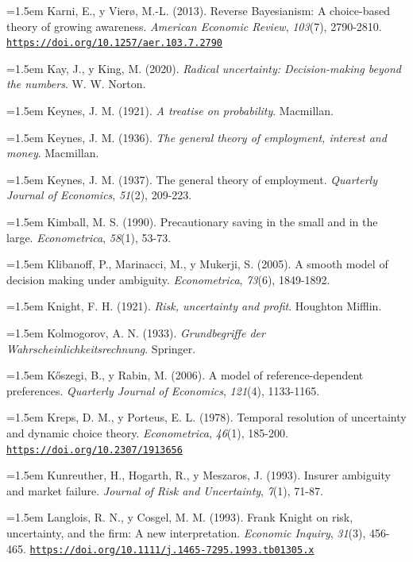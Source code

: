 \documentclass[10pt,a4paper]{article}
\begin{document}
\noindent\hangindent=1.5em Karni, E., y Vierø, M.-L. (2013). Reverse Bayesianism: A choice-based theory of growing awareness. \textit{American Economic Review}, \textit{103}(7), 2790-2810. \href{https://doi.org/10.1257/aer.103.7.2790}{\nolinkurl{https://doi.org/10.1257/aer.103.7.2790}}

\noindent\hangindent=1.5em Kay, J., y King, M. (2020). \textit{Radical uncertainty: Decision-making beyond the numbers}. W. W. Norton.

\noindent\hangindent=1.5em Keynes, J. M. (1921). \textit{A treatise on probability}. Macmillan.

\noindent\hangindent=1.5em Keynes, J. M. (1936). \textit{The general theory of employment, interest and money}. Macmillan.

\noindent\hangindent=1.5em Keynes, J. M. (1937). The general theory of employment. \textit{Quarterly Journal of Economics}, \textit{51}(2), 209-223.

\noindent\hangindent=1.5em Kimball, M. S. (1990). Precautionary saving in the small and in the large. \textit{Econometrica}, \textit{58}(1), 53-73.

\noindent\hangindent=1.5em Klibanoff, P., Marinacci, M., y Mukerji, S. (2005). A smooth model of decision making under ambiguity. \textit{Econometrica}, \textit{73}(6), 1849-1892.

\noindent\hangindent=1.5em Knight, F. H. (1921). \textit{Risk, uncertainty and profit}. Houghton Mifflin.

\noindent\hangindent=1.5em Kolmogorov, A. N. (1933). \textit{Grundbegriffe der Wahrscheinlichkeitsrechnung}. Springer.

\noindent\hangindent=1.5em K\H{o}szegi, B., y Rabin, M. (2006). A model of reference-dependent preferences. \textit{Quarterly Journal of Economics}, \textit{121}(4), 1133-1165.

\noindent\hangindent=1.5em Kreps, D. M., y Porteus, E. L. (1978). Temporal resolution of uncertainty and dynamic choice theory. \textit{Econometrica}, \textit{46}(1), 185-200. \href{https://doi.org/10.2307/1913656}{\nolinkurl{https://doi.org/10.2307/1913656}}

\noindent\hangindent=1.5em Kunreuther, H., Hogarth, R., y Meszaros, J. (1993). Insurer ambiguity and market failure. \textit{Journal of Risk and Uncertainty}, \textit{7}(1), 71-87.

\noindent\hangindent=1.5em Langlois, R. N., y Cosgel, M. M. (1993). Frank Knight on risk, uncertainty, and the firm: A new interpretation. \textit{Economic Inquiry}, \textit{31}(3), 456-465. \href{https://doi.org/10.1111/j.1465-7295.1993.tb01305.x}{\nolinkurl{https://doi.org/10.1111/j.1465-7295.1993.tb01305.x}}
\end{document}
